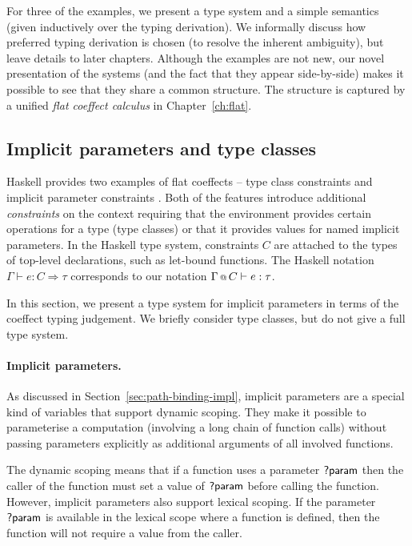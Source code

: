 For three of the examples, we present a type system and a simple semantics (given inductively over
the typing derivation). We informally discuss how preferred typing derivation is chosen (to resolve
the inherent ambiguity), but leave details to later chapters. Although the examples
are not new, our novel presentation of the systems (and the fact that they appear side-by-side)
makes it possible to see that they share a common structure. The structure is captured by
a unified \emph{flat coeffect calculus} in Chapter~\ref{ch:flat}.


\subsection{Implicit parameters and type classes}
\label{sec:applications-flat-impl}

Haskell provides two examples of flat coeffects -- type class constraints and implicit parameter
constraints \cite{app-type-classes,app-implicit-parameters}. Both of the features introduce additional
\emph{constraints} on the context requiring that the environment provides certain operations for
a type (type classes) or that it provides values for named implicit parameters.
In the Haskell type system, constraints $C$ are attached to the types of top-level declarations,
such as let-bound functions. The Haskell notation $\Gamma \vdash e : C \Rightarrow \tau$
corresponds to our notation $\Gamma \,\text{\scriptsize @}\, {{\text{$C$}}} \vdash e : \tau$.

In this section, we present a type system for implicit parameters in terms of the coeffect typing
judgement. We briefly consider type classes, but do not give a full type system.

\paragraph{Implicit parameters.}
As discussed in Section~\ref{sec:path-binding-impl}, implicit parameters are a special kind of
variables that support dynamic scoping. They make it possible to parameterise a computation
(involving a long chain of function calls) without passing parameters explicitly as additional
arguments of all involved functions.

The dynamic scoping means that if a function uses a parameter $\textnormal{\sffamily ?param}$ then the caller of the
function must set a value of $\textnormal{\sffamily ?param}$ before calling the function. However, implicit
parameters also support lexical scoping. If the parameter $\textnormal{\sffamily ?param}$ is available in the
lexical scope where a function is defined, then the function will not require a value from the caller.


